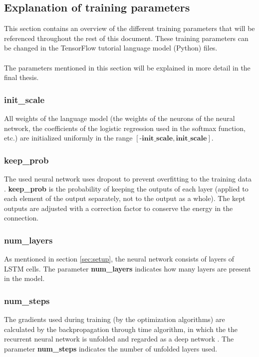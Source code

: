 \documentclass[10pt,a4paper,titlepage]{article}
\begin{document}
\subsection{Explanation of training parameters}
\label{subsec:exp}

This section contains an overview of the different training parameters that will be referenced throughout the rest of this document. These training parameters can be changed in the TensorFlow tutorial language model (Python) files. \\
\\
The parameters mentioned in this section will be explained in more detail in the final thesis.

\subsubsection{init\_scale}
	
All weights of the language model (the weights of the neurons of the neural network, the coefficients of the logistic regression used in the softmax function, etc.) are initialized uniformly in the range $[\textbf{-init\_scale},\textbf{init\_scale}]$.

\subsubsection{keep\_prob}

The used neural network uses dropout to prevent overfitting to the training data \cite{dropout}. \textbf{keep\_prob} is the probability of keeping the outputs of each layer (applied to each element of the output separately, not to the output as a whole). The kept outputs are adjusted with a correction factor to conserve the energy in the connection.

\subsubsection{num\_layers}

As mentioned in section \ref{sec:setup}, the neural network consists of layers of LSTM cells. The parameter \textbf{num\_layers} indicates how many layers are present in the model.

\subsubsection{num\_steps}
\label{subsubsec:numsteps}

The gradients used during training (by the optimization algorithms) are calculated by the backpropagation through time algorithm, in which the the recurrent neural network is unfolded and regarded as a deep network \cite{bptt}. The parameter \textbf{num\_steps} indicates the number of unfolded layers used.
\end{document}
